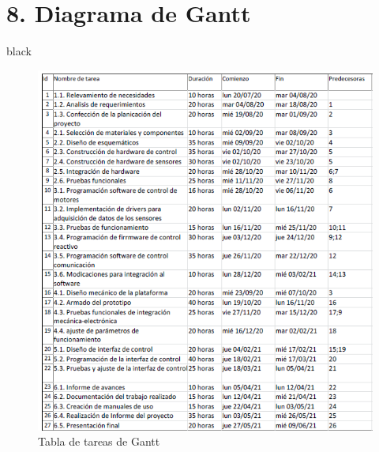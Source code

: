 \documentclass[11pt]{charter}
\begin{document}
\section{8. Diagrama de Gantt}
\label{sec:gantt}

\begin{consigna}{black}

\begin{figure}[htpb]
\centering 
\includegraphics[width=\textwidth]{./Figuras/gantttabla.PNG}
\caption{Tabla de tareas de Gantt}
\label{fig:gantt}
\end{figure}


\end{consigna}
\end{document}
